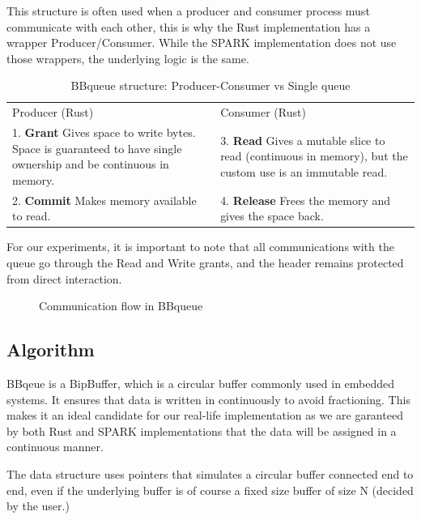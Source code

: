 \documentclass[nomenclature, english, bibtex]{kththesis}
\begin{document}
This structure is often used when a producer and consumer process must communicate with each other, this is why the Rust implementation has a wrapper Producer/Consumer. While the SPARK implementation does not use those wrappers, the underlying logic is the same.
\begin{table}[ht!]
\footnotesize
\centering
\caption{BBqueue structure: Producer-Consumer vs Single queue}
\label{tab:bbqueue}
\begin{tabular}{ |m{5cm}|m{5cm}| }
\hline
\rowcolor{color1bg!20}
\multicolumn{2}{|c|}{BBQueue (SPARK)} \\
\hline
\rowcolor{color1bg!20}
\centering Producer (Rust) & \centering Consumer (Rust) \tabularnewline
\hline
1. \textbf{Grant} \newline Gives space to write bytes. Space is guaranteed to have single ownership and be continuous in memory. & 3. \textbf{Read} \newline Gives a mutable slice to read (continuous in memory), but the custom use is an immutable read. \tabularnewline
\hline
2. \textbf{Commit} \newline Makes memory available to read. & 4. \textbf{Release} \newline Frees the memory and gives the space back. \tabularnewline
\hline
\end{tabular}
\end{table}
\FloatBarrier
For our experiments, it is important to note that all communications with the queue go through the Read and Write grants, and the header remains protected from direct interaction. 

\begin{figure}[ht!]
  \centering 

\caption{Communication flow in BBqueue}
\end{figure}
\FloatBarrier

\subsection{Algorithm}

BBqeue is a BipBuffer, which is a circular buffer commonly used in embedded systems. It ensures that data is written in continuously to avoid fractioning. This makes it an ideal candidate for our real-life implementation as we are garanteed by both Rust and SPARK implementations that the data will be assigned in a continuous manner.

The data structure uses pointers that simulates a circular buffer connected end to end, even if the underlying buffer is of course a fixed size buffer of size N (decided by the user.)  
\end{document}

